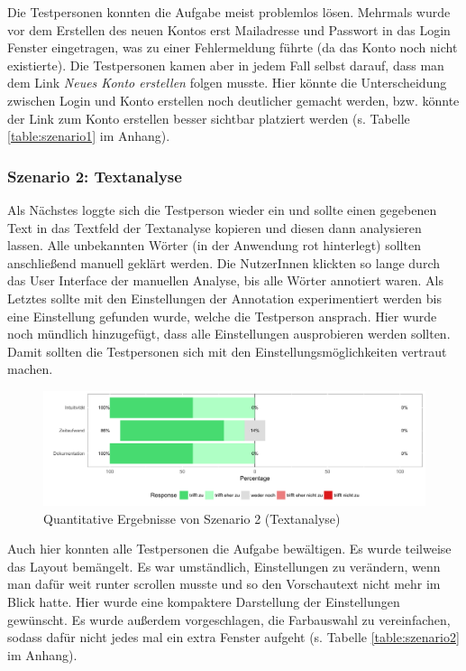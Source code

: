 Die Testpersonen konnten die Aufgabe meist problemlos lösen. Mehrmals wurde vor dem Erstellen des neuen Kontos erst Mailadresse und Passwort in das Login Fenster eingetragen, was zu einer Fehlermeldung führte (da das Konto noch nicht existierte). Die Testpersonen kamen aber in jedem Fall selbst darauf, dass man dem Link \textit{Neues Konto erstellen} folgen musste. Hier könnte die Unterscheidung zwischen Login und Konto erstellen noch deutlicher gemacht werden, bzw. könnte der Link zum Konto erstellen besser sichtbar platziert werden (s. Tabelle \ref{table:szenario1} im Anhang).

\subsubsection{Szenario 2: Textanalyse}

Als Nächstes loggte sich die Testperson wieder ein und sollte einen gegebenen Text in das Textfeld der Textanalyse kopieren und diesen dann analysieren lassen. Alle unbekannten Wörter (in der Anwendung rot hinterlegt) sollten anschließend manuell geklärt werden. Die NutzerInnen klickten so lange durch das User Interface der manuellen Analyse, bis alle Wörter annotiert waren. Als Letztes sollte mit den Einstellungen der Annotation experimentiert werden bis eine Einstellung gefunden wurde, welche die Testperson ansprach. Hier wurde noch mündlich hinzugefügt, dass alle Einstellungen ausprobieren werden sollten. Damit sollten die Testpersonen sich mit den Einstellungsmöglichkeiten vertraut machen.

\begin{figure}[h!]
	\centering
	\includegraphics[width=.8\linewidth]{figures/evaluation/scenario2}
	\caption{Quantitative Ergebnisse von Szenario 2 (Textanalyse)}
	\label{fig:evaluation-sc2}
\end{figure}

Auch hier konnten alle Testpersonen die Aufgabe bewältigen. Es wurde teilweise das Layout bemängelt. Es war umständlich, Einstellungen zu verändern, wenn man dafür weit runter scrollen musste und so den Vorschautext nicht mehr im Blick hatte. Hier wurde eine kompaktere Darstellung der Einstellungen gewünscht. Es wurde außerdem vorgeschlagen, die Farbauswahl zu vereinfachen, sodass dafür nicht jedes mal ein extra Fenster aufgeht (s. Tabelle \ref{table:szenario2} im Anhang).

